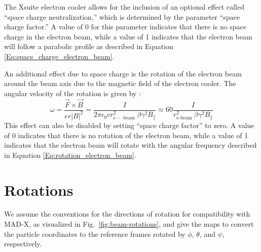 The Xsuite electron cooler allows for the inclusion of an optional effect called ``space charge neutralization,'' which is determined by the parameter ``space charge factor.'' A value of 0 for this parameter indicates that there is no space charge in the electron beam, while a value of 1 indicates that the electron beam will follow a parabolic profile as described in Equation \ref{Eq:space_charge_electron_beam}.

An additional effect due to space charge is the rotation of the electron beam around the beam axis due to the magnetic field of the electron cooler. The angular velocity of the rotation is given by \cite{poth1990electron}:
\begin{equation}
\omega
=\frac{\vec{F} \times \vec{B}}{e r|B|^2}
=\frac{I}{2 \pi \epsilon_0 c r_{\mathrm{e}-\text { beam }}^2 \beta \gamma^2 B_{\|}}
\approx 60 \frac{I}{r_{\mathrm{e} \text {-beam }}^2 \beta \gamma^2 B_{\|}}
\label{Eq:rotation_electron_beam}
\end{equation}
This effect can also be disabled by setting ``space charge factor'' to zero. A value of 0 indicates that there is no rotation of the electron beam, while a value of 1 indicates that the electron beam will rotate with the angular frequency described in Equation \ref{Eq:rotation_electron_beam}.


\section{Rotations}

We assume the conventions for the directions of rotation for compatibility with \mbox{MAD-X}, as visualized in Fig.~\ref{fig:beam-rotations}, and give the maps to convert the particle coordinates to the reference frames rotated by $\phi$, $\theta$, and $\psi$, respectively.

